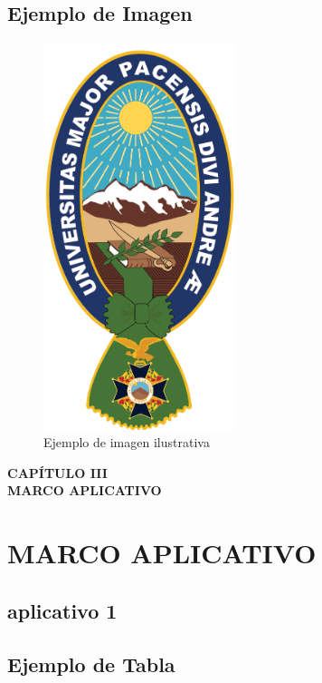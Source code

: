 \documentclass[12pt,oneside,letterpaper]{book}
\begin{document}
\section{Ejemplo de Imagen}
\begin{figure}[H]
\centering
\includegraphics[width=0.5\textwidth]{images/logo_umsa.png} %
\caption{Ejemplo de imagen ilustrativa}
\label{fig:ejemplo1}
\end{figure}

\newpage
\thispagestyle{empty}
\vspace*{0.35\textheight}
\begin{center}
	{\Huge\textbf{CAPÍTULO III}} \\[0.5cm]
	{\Huge\textbf{MARCO APLICATIVO}}
\end{center}

\newpage
\chapter{MARCO APLICATIVO}
\thispagestyle{fancy}

\section{aplicativo 1}
\lipsum[1]
\section{Ejemplo de Tabla}
\end{document}

